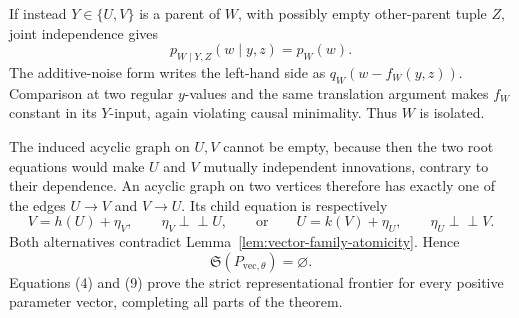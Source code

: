If instead \(Y\in\{U,V\}\) is a parent of \(W\), with possibly empty other-parent tuple \(Z\), joint independence gives
\[
p_{W\mid Y,Z}(w\mid y,z)=p_W(w). \tag{7}
\]
The additive-noise form writes the left-hand side as \(q_W(w-f_W(y,z))\). Comparison at two regular \(y\)-values and the same translation argument makes \(f_W\) constant in its \(Y\)-input, again violating causal minimality. Thus \(W\) is isolated.

The induced acyclic graph on \(U,V\) cannot be empty, because then the two root equations would make \(U\) and \(V\) mutually independent innovations, contrary to their dependence. An acyclic graph on two vertices therefore has exactly one of the edges \(U\to V\) and \(V\to U\). Its child equation is respectively
\[
V=h(U)+\eta_V,
\qquad \eta_V\perp\!\!\!\perp U,
\qquad\text{or}\qquad
U=k(V)+\eta_U,
\qquad \eta_U\perp\!\!\!\perp V. \tag{8}
\]
Both alternatives contradict Lemma~\ref{lem:vector-family-atomicity}. Hence
\[
\mathfrak S(P_{\mathrm{vec},\theta})=\varnothing. \tag{9}
\]
Equations (4) and (9) prove the strict representational frontier for every positive parameter vector, completing all parts of the theorem.